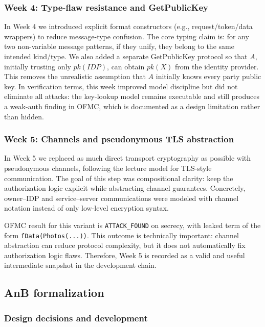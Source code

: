 \subsubsection{Week 4: Type-flaw resistance and GetPublicKey}

In Week 4 we introduced explicit format constructors (e.g., request/token/data wrappers) to reduce message-type confusion.
The core typing claim is: for any two non-variable message patterns, if they unify, they belong to the same intended kind/type.
We also added a separate GetPublicKey protocol so that $A$, initially trusting only $pk(IDP)$, can obtain $pk(X)$ from the identity provider.
This removes the unrealistic assumption that $A$ initially knows every party public key.
In verification terms, this week improved model discipline but did not eliminate all attacks:
the key-lookup model remains executable and still produces a weak-auth finding in OFMC, which is documented as a design limitation rather than hidden.

\subsubsection{Week 5: Channels and pseudonymous TLS abstraction}

In Week 5 we replaced as much direct transport cryptography as possible with pseudonymous channels, following the lecture model for TLS-style communication.
The goal of this step was compositional clarity: keep the authorization logic explicit while abstracting channel guarantees.
Concretely, owner--IDP and service--server communications were modeled with channel notation instead of only low-level encryption syntax.

OFMC result for this variant is \texttt{ATTACK\_FOUND} on secrecy, with leaked term of the form \texttt{fData(Photos(...))}.
This outcome is technically important: channel abstraction can reduce protocol complexity, but it does not automatically fix authorization logic flaws.
Therefore, Week 5 is recorded as a valid and useful intermediate snapshot in the development chain.

\subsection{AnB formalization}

\subsubsection{Design decisions and development}

